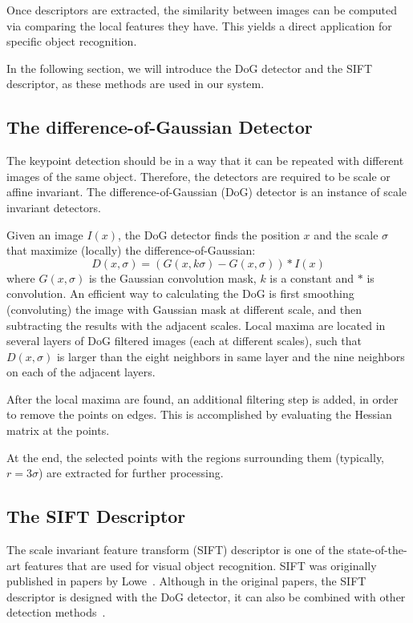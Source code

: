\documentclass[12pt,final,twoside]{report}
\begin{document}
Once descriptors are extracted, the similarity between images can be computed via comparing the local features they have. This yields a direct application for specific object recognition.

In the following section, we will introduce the DoG detector and the SIFT descriptor, as these methods are used in our system.

\subsection{The difference-of-Gaussian Detector}
The keypoint detection should be in a way that it can be repeated with different images of the same object. Therefore, the detectors are required to be scale or affine invariant. The difference-of-Gaussian (DoG) detector is an instance of scale invariant detectors.

Given an image $I(x)$, the DoG detector finds the position $x$ and the scale $\sigma$ that maximize (locally) the difference-of-Gaussian:
\begin{equation}
  D(x,\sigma) = (G(x,k\sigma) - G(x,\sigma)) * I(x)
\end{equation}
where $G(x,\sigma)$ is the Gaussian convolution mask, $k$ is a constant and $*$ is convolution. An efficient way to calculating the DoG is first smoothing (convoluting) the image with Gaussian mask at different scale, and then subtracting the results with the adjacent scales. Local maxima are located in several layers of DoG filtered images (each at different scales), such that $D(x,\sigma)$ is larger than the eight neighbors in same layer and the nine neighbors on each of the adjacent layers.

After the local maxima are found, an additional filtering step is added, in order to remove the points on edges. This is accomplished by evaluating the Hessian matrix at the points.

At the end, the selected points with the regions surrounding them (typically, $r = 3\sigma$) are extracted for further processing.

\subsection{The SIFT Descriptor}
The scale invariant feature transform (SIFT) descriptor is one of the state-of-the-art features that are used for visual object recognition. SIFT was originally published in papers by Lowe~\cite{lowe_object_1999,lowe_distinctive_2004}. 
Although in the original papers, the SIFT descriptor is designed with the DoG detector, it can also be combined with other detection methods~\cite{mikolajczyk_performance_2005}.
\end{document}
